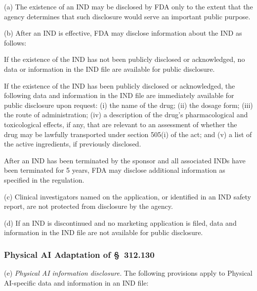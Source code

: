 (a) The existence of an IND may be disclosed by FDA only to the extent that the agency determines that such disclosure would serve an important public purpose.

(b) After an IND is effective, FDA may disclose information about the IND as follows:

\begin{description}[leftmargin=0.5cm,style=sameline]
\item[(1)] If the existence of the IND has not been publicly disclosed or acknowledged, no data or information in the IND file are available for public disclosure.
\item[(2)] If the existence of the IND has been publicly disclosed or acknowledged, the following data and information in the IND file are immediately available for public disclosure upon request: (i) the name of the drug; (ii) the dosage form; (iii) the route of administration; (iv) a description of the drug's pharmacological and toxicological effects, if any, that are relevant to an assessment of whether the drug may be lawfully transported under section 505(i) of the act; and (v) a list of the active ingredients, if previously disclosed.
\item[(3)] After an IND has been terminated by the sponsor and all associated INDs have been terminated for 5 years, FDA may disclose additional information as specified in the regulation.
\end{description}

(c) Clinical investigators named on the application, or identified in an IND safety report, are not protected from disclosure by the agency.

(d) If an IND is discontinued and no marketing application is filed, data and information in the IND file are not available for public disclosure.

\subsubsection{Physical AI Adaptation of \S~312.130}

(e) \textit{Physical AI information disclosure.} The following provisions apply to Physical AI-specific data and information in an IND file:

